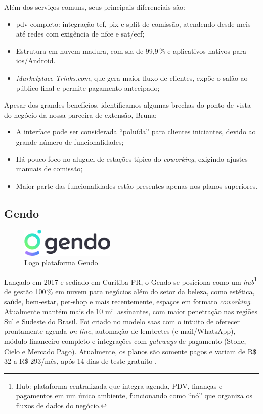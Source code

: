 Além dos serviços comuns, seus principais diferenciais são:

\begin{itemize}
	\item \gls{pdv} completo: integração \gls{tef}, \gls{pix} e split de comissão, atendendo desde \gls{mei}s até redes com exigência de \gls{nfce} e \gls{sat}/\gls{ecf};
	\item Estrutura em nuvem madura, com \gls{sla} de 99,9\,\% e aplicativos nativos para \gls{ios}/Android.
	\item \emph{Marketplace} \textit{Trinks.com}, que gera maior fluxo de clientes, expõe o salão ao
	público final e permite pagamento antecipado;
\end{itemize}

Apesar dos grandes benefícios, identificamos algumas brechas do ponto de vista do negócio da nossa
parceira de extensão, Bruna:

\begin{itemize}
	\item A interface pode ser considerada “poluída” para clientes iniciantes, devido ao grande
	número de funcionalidades;
	\item Há pouco foco no aluguel de estações típico do \emph{coworking}, exigindo ajustes manuais de
	comissão;
	\item Maior parte das funcionalidades estão presentes apenas nos planos superiores.
\end{itemize}

\subsection{Gendo}

\begin{figure}[htb]
	\centering
	\includegraphics[width=0.4\textwidth]{cap01-Introducao/Images/1.4.2_Gendo}
	\caption{Logo plataforma Gendo}
	\label{fig:Gendo}
\end{figure}

 \FloatBarrier

Lançado em 2017 e sediado em Curitiba-PR, o Gendo se posiciona como um \emph{hub}\footnote{Hub: plataforma centralizada que integra agenda, PDV, finanças e pagamentos em um único ambiente, funcionando como “nó” que organiza os fluxos de dados do negócio.} de gestão 100\,\% em nuvem para negócios além do setor da beleza, como estética, saúde, bem-estar, pet-shop e mais recentemente, espaços em formato \emph{coworking}. 
Atualmente mantém mais de 10 mil assinantes, com maior penetração nas regiões Sul e Sudeste do Brasil. Foi criado no modelo \gls{saas} com o intuito de oferecer prontamente agenda \emph{on-line}, automação de lembretes (e-mail/WhatsApp), módulo financeiro completo e integrações com \emph{gateways} de pagamento (Stone, Cielo e Mercado Pago). Atualmente, os planos são somente pagos e variam de R\$ 32 a R\$ 293/mês, após 14 dias de teste gratuito \cite{Gendo}.

